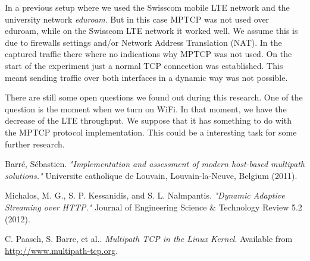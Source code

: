 \documentclass{llncs}
\begin{document}
In a previous setup where we used the Swisscom mobile LTE network and the university network \emph{eduroam}. But in this case MPTCP was not used over eduroam, while on the Swisscom LTE network it worked well. We assume this is due to firewalls settings and/or Network Address Translation (NAT). In the captured traffic there where no indications why MPTCP was not used. On the start of the experiment just a normal TCP connection was established. This meant sending traffic over both interfaces in a dynamic way was not possible.

There are still some open questions we found out during this research. One of the question is the moment when we turn on WiFi. In that moment, we have the decrease of the LTE throughput. We suppose that it has something to do with the MPTCP protocol implementation. This could be a interesting task for some further research.



\begin{thebibliography}{1}
Barré, Sébastien. \emph{"Implementation and assessment of modern host-based multipath solutions." } Universite catholique de Louvain, Louvain-la-Neuve, Belgium (2011).

Michalos, M. G., S. P. Kessanidis, and S. L. Nalmpantis. \emph{"Dynamic Adaptive Streaming over HTTP."} Journal of Engineering Science \& Technology Review 5.2 (2012).

C. Paasch, S. Barre, et al.. \emph{Multipath TCP in the Linux Kernel}. Available from \url{http://www.multipath-tcp.org}.


\end{thebibliography}
\end{document}
